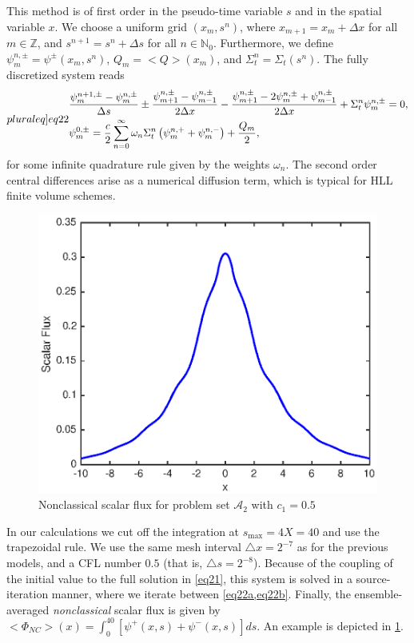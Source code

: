 \documentclass[12pt]{article}
\newcommand{\bl}{\big<}
\newcommand{\bg}{\big>}
\newcommand{\seta}{\mathcal{A}}
\begin{document}
{This method is of first order in the pseudo-time variable $s$ and in the spatial variable $x$.
We choose a uniform grid $(x_m,s^n)$, where $x_{m+1} = x_{m} + \Delta x$ for all $m\in\mathbb{Z}$, and $s^{n+1} = s^n + \Delta s$ for all $n\in\mathbb{N}_0$.
Furthermore, we define $\psi_{m}^{n,\pm}= \psi^\pm(x_{m},s^n)$, $Q_m = \bl Q\bg (x_m)$, and $\Sigma_t^n=\Sigma_t(s^n)$.
The fully discretized system reads
\begin{subequations}\label[pluraleq]{eq22}
\begin{align}
	& \frac{\psi^{n+1,\pm}_m-\psi^{n,\pm}_m}{\Delta s} \pm \frac{\psi^{n,\pm}_{m+1}-\psi_{m-1}^{n,\pm}}{2\Delta x} - 
			\frac{\psi^{n,\pm}_{m+1}-2\psi_m^{n,\pm}+\psi_{m-1}^{n,\pm}}{2\Delta x}   + \Sigma_t^n \psi^{n,\pm}_m = 0, \label{eq22a}\\
	&  \psi_m^{0,\pm} = \frac{c}{2}\sum\limits_{n=0}^\infty \omega_n \Sigma_t^n\left( \psi_m^{n,+} + \psi^{n,-}_m\right)  +  \frac{Q_m}{2},\label{eq22b}	
\end{align}
\end{subequations}
for some infinite quadrature rule given by the weights $\omega_n$.
The second order central differences arise as a numerical diffusion term, which is typical for HLL finite volume schemes.
\begin{figure}[htb]
  \centering
  \includegraphics[scale=1]{fig6.eps}
  \caption{Nonclassical scalar flux for problem set $\seta_2$ with $c_1=0.5$}
  \label{fig6}
\end{figure}

In our calculations we cut off the integration at $s_{\text{max}}=4X=40$ and use the trapezoidal rule.
We use the same mesh interval $\triangle x=2^{-7}$ as for the previous models, and a CFL number $0.5$ (that is, $\triangle s = 2^{-8}$). 
Because of the coupling of the initial value to the full solution in \cref{eq21}, this system is solved in a source-iteration manner, where we iterate between \cref{eq22a,eq22b}.
Finally, the ensemble-averaged {\em nonclassical} scalar flux is given by $\bl\Phi_{NC}\bg(x) = \int_0^{40}[\psi^+(x,s)+\psi^-(x,s)]ds$.
An example is depicted in \cref{fig6}.

}
\end{document}
